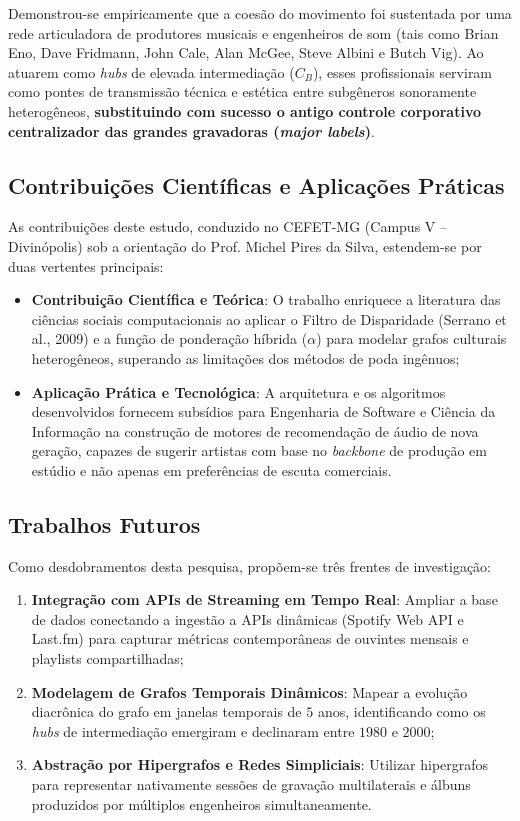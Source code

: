 \documentclass[conference]{IEEEtran}
\begin{document}
Demonstrou-se empiricamente que a coesão do movimento foi sustentada por uma rede articuladora de produtores musicais e engenheiros de som (tais como Brian Eno, Dave Fridmann, John Cale, Alan McGee, Steve Albini e Butch Vig). Ao atuarem como \textit{hubs} de elevada intermediação ($C_B$), esses profissionais serviram como pontes de transmissão técnica e estética entre subgêneros sonoramente heterogêneos, \textbf{substituindo com sucesso o antigo controle corporativo centralizador das grandes gravadoras (\textit{major labels})}.

\subsection{Contribuições Científicas e Aplicações Práticas}
As contribuições deste estudo, conduzido no CEFET-MG (Campus V -- Divinópolis) sob a orientação do Prof. Michel Pires da Silva, estendem-se por duas vertentes principais:
\begin{itemize}
    \item \textbf{Contribuição Científica e Teórica}: O trabalho enriquece a literatura das ciências sociais computacionais ao aplicar o Filtro de Disparidade (Serrano et al., 2009) e a função de ponderação híbrida ($\alpha$) para modelar grafos culturais heterogêneos, superando as limitações dos métodos de poda ingênuos;
    \item \textbf{Aplicação Prática e Tecnológica}: A arquitetura e os algoritmos desenvolvidos fornecem subsídios para Engenharia de Software e Ciência da Informação na construção de motores de recomendação de áudio de nova geração, capazes de sugerir artistas com base no \textit{backbone} de produção em estúdio e não apenas em preferências de escuta comerciais.
\end{itemize}

\subsection{Trabalhos Futuros}
Como desdobramentos desta pesquisa, propõem-se três frentes de investigação:
\begin{enumerate}
    \item \textbf{Integração com APIs de Streaming em Tempo Real}: Ampliar a base de dados conectando a ingestão a APIs dinâmicas (Spotify Web API e Last.fm) para capturar métricas contemporâneas de ouvintes mensais e playlists compartilhadas;
    \item \textbf{Modelagem de Grafos Temporais Dinâmicos}: Mapear a evolução diacrônica do grafo em janelas temporais de $5$ anos, identificando como os \textit{hubs} de intermediação emergiram e declinaram entre $1980$ e $2000$;
    \item \textbf{Abstração por Hipergrafos e Redes Simpliciais}: Utilizar hipergrafos para representar nativamente sessões de gravação multilaterais e álbuns produzidos por múltiplos engenheiros simultaneamente.
\end{enumerate}
\end{document}
